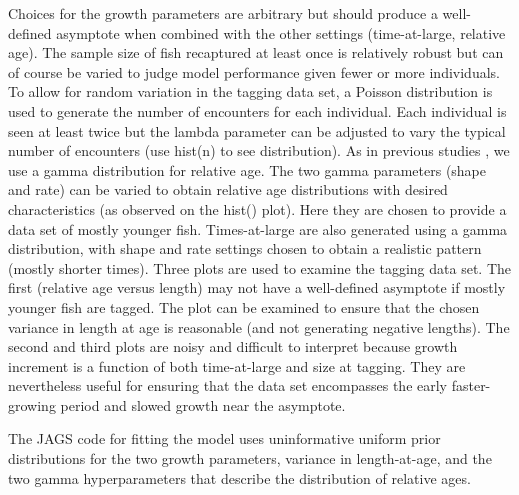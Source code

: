 \documentclass[
]{krantz}
\begin{document}
Choices for the growth parameters are arbitrary but should produce a well-defined asymptote when combined with the other settings (time-at-large, relative age). The sample size of fish recaptured at least once is relatively robust but can of course be varied to judge model performance given fewer or more individuals. To allow for random variation in the tagging data set, a Poisson distribution is used to generate the number of encounters for each individual. Each individual is seen at least twice but the lambda parameter can be adjusted to vary the typical number of encounters (use hist(n) to see distribution). As in previous studies \citep{wang.etal1995, zhang.etal2009, scherrer.etal2021}, we use a gamma distribution for relative age. The two gamma parameters (shape and rate) can be varied to obtain relative age distributions with desired characteristics (as observed on the hist() plot). Here they are chosen to provide a data set of mostly younger fish. Times-at-large are also generated using a gamma distribution, with shape and rate settings chosen to obtain a realistic pattern (mostly shorter times). Three plots are used to examine the tagging data set. The first (relative age versus length) may not have a well-defined asymptote if mostly younger fish are tagged. The plot can be examined to ensure that the chosen variance in length at age is reasonable (and not generating negative lengths). The second and third plots are noisy and difficult to interpret because growth increment is a function of both time-at-large and size at tagging. They are nevertheless useful for ensuring that the data set encompasses the early faster-growing period and slowed growth near the asymptote.

The JAGS code for fitting the model uses uninformative uniform prior distributions for the two growth parameters, variance in length-at-age, and the two gamma hyperparameters that describe the distribution of relative ages.
\end{document}
